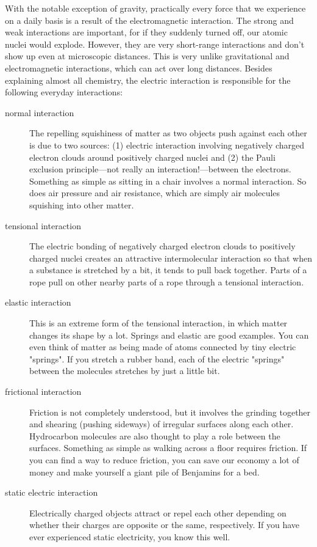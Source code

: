 \documentclass[12pt,twocolumn]{article}
\begin{document}
With the notable exception of gravity, practically every force that we experience on a daily basis is a result of the electromagnetic interaction.  The strong and weak interactions are important, for if they suddenly turned off, our atomic nuclei would explode.  However, they are very short-range interactions and don't show up even at microscopic distances.  This is very unlike gravitational and electromagnetic interactions, which can act over long distances.  Besides explaining almost all chemistry, the electric interaction is responsible for the following everyday interactions:
\begin{description}
\item[normal interaction] The repelling squishiness of matter as two objects push against each other is due to two sources: (1) electric interaction involving negatively charged electron clouds around positively charged nuclei and (2) the Pauli exclusion principle---not really an interaction!---between the electrons.  Something as simple as sitting in a chair involves a normal interaction.  So does air pressure and air resistance, which are simply air molecules squishing into other matter.
\item[tensional interaction] The electric bonding of negatively charged electron clouds to positively charged nuclei creates an attractive intermolecular interaction so that when a substance is stretched by a bit, it tends to pull back together.  Parts of a rope pull on other nearby parts of a rope through a tensional interaction.
\item[elastic interaction] This is an extreme form of the tensional interaction, in which matter changes its shape by a lot.  Springs and elastic are good examples.  You can even think of matter as being made of atoms connected by tiny electric "springs".  If you stretch a rubber band, each of the electric "springs" between the molecules stretches by just a little bit.
\item[frictional interaction] Friction is not completely understood, but it involves the grinding together and shearing (pushing sideways) of irregular surfaces along each other.  Hydrocarbon molecules are also thought to play a role between the surfaces.  Something as simple as walking across a floor requires friction.  If you can find a way to reduce friction, you can save our economy a lot of money and make yourself a giant pile of Benjamins for a bed.
\item[static electric interaction] Electrically charged objects attract or repel each other depending on whether their charges are opposite or the same, respectively.  If you have ever experienced static electricity, you know this well.
\end{description}



\end{document}
